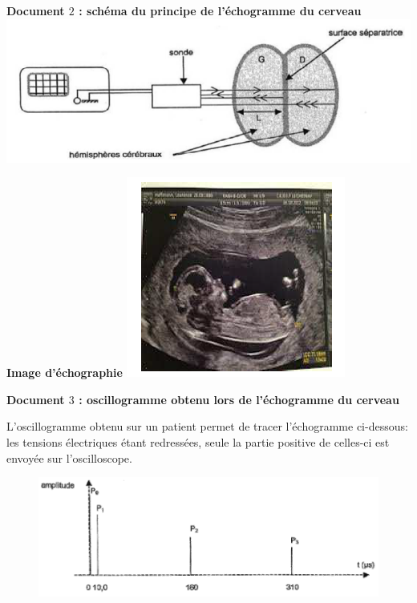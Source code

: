 \begin{minipage}[c]{.45\linewidth}
\begin{center}
\textbf{Document $2$ : schéma du principe de l'échogramme du cerveau}
\includegraphics[width=\columnwidth]{images/Exo1_Ondes_Schema_Echogramme_Cerveau}
\end{center}
\end{minipage}
\begin{minipage}[c]{.45\linewidth}
\begin{center}
\textbf{Image d'échographie}\newline
\includegraphics[width=0.45\columnwidth]{images/Exo1_Ondes_Echographie}
\end{center}
\end{minipage}

\vspace{0.3cm}

\textbf{Document $3$ : oscillogramme obtenu lors de l'échogramme du cerveau}

\vspace{0.3cm}

L'oscillogramme obtenu sur un patient permet de tracer l'échogramme ci-dessous: les tensions électriques étant redressées, seule la partie positive de celles-ci est envoyée sur l'oscilloscope.

\begin{figure}[h]
\begin{center}
\includegraphics[width=0.75\columnwidth]{images/Exo1_Ondes_Oscillogramme_Echo_Cerveau}
\end{center}
\end{figure}

